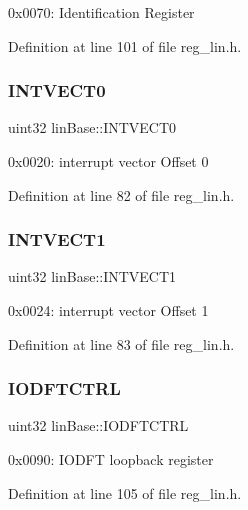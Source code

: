 0x0070\+: Identification Register 

Definition at line 101 of file reg\+\_\+lin.\+h.

\mbox{\label{structlinBase_a1029deea979390be9087f8d8727f0d96}} 
\subsubsection{\texorpdfstring{I\+N\+T\+V\+E\+C\+T0}{INTVECT0}}
{\footnotesize\ttfamily uint32 lin\+Base\+::\+I\+N\+T\+V\+E\+C\+T0}

0x0020\+: interrupt vector Offset 0 

Definition at line 82 of file reg\+\_\+lin.\+h.

\mbox{\label{structlinBase_ad576fdd8dc5d3d7ade8c021b3e747127}} 
\subsubsection{\texorpdfstring{I\+N\+T\+V\+E\+C\+T1}{INTVECT1}}
{\footnotesize\ttfamily uint32 lin\+Base\+::\+I\+N\+T\+V\+E\+C\+T1}

0x0024\+: interrupt vector Offset 1 

Definition at line 83 of file reg\+\_\+lin.\+h.

\mbox{\label{structlinBase_a17730d4db36753ac405e9c5fa960972d}} 
\subsubsection{\texorpdfstring{I\+O\+D\+F\+T\+C\+T\+RL}{IODFTCTRL}}
{\footnotesize\ttfamily uint32 lin\+Base\+::\+I\+O\+D\+F\+T\+C\+T\+RL}

0x0090\+: I\+O\+D\+FT loopback register 

Definition at line 105 of file reg\+\_\+lin.\+h.

\mbox{\label{structlinBase_abaa80160140376cc30e04bdf01c3541f}} 
